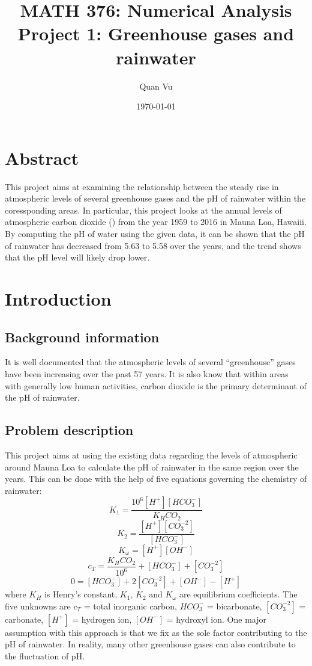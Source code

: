\documentclass{article}
\title{%
	MATH 376: Numerical Analysis \\
	\large  Project 1: Greenhouse gases and rainwater
	}
\author{Quan Vu}
\date{\today}
\begin{document}
	\maketitle
	
	\section{Abstract}
	This project aims at examining the relationship between the steady 	rise in atmospheric levels of several greenhouse gases and the pH of rainwater within the coressponding areas. In particular, this project looks at the annual levels of atmospheric carbon dioxide () from the year 1959 to 2016 in Mauna Loa, Hawaiii. By computing the pH of water using the given data, it can be shown that the pH of rainwater has decreased from 5.63 to 5.58 over the years, and the trend shows that the pH level will likely drop lower.
	
	\section{Introduction}
	
	\subsection{Background information}
	It is well documented that the atmospheric levels of several “greenhouse” gases have been increasing over the past 57 years. It is also know that within areas with generally low human activities, carbon dioxide is the primary determinant of the pH of rainwater.
	
	\subsection{Problem description}
	This project aims at using the existing data regarding the levels of atmospheric  around Mauna Loa to calculate the pH of rainwater in the same region over the years. This can be done with the help of five equations governing the chemistry of rainwater:
	\[ K_1 = \frac{10^6[H^+][HCO_3^-]}{K_HCO_2} \tag{1} \]
	\[ K_2 = \frac{[H^+][CO_3^{-2}]}{[HCO_3^-]} \tag{2} \]
	\[ K_\omega = [H^+][OH^-] \tag{3} \]
	\[ c_T = \frac{K_HCO_2}{10^6} + [HCO_3^-] + [CO_3^{-2}] \tag{4} \]
	\[ 0 = [HCO_3^-] + 2[CO_3^{-2}] + [OH^-] - [H^+] \tag{5} \]
	where ${K_H}$ is Henry's constant, ${K_1}$, ${K_2}$ and ${K_\omega}$ are equilibrium coefficients. The five unknowns are ${c_T}$ = total inorganic carbon, ${HCO_3^-}$ = bicarbonate, ${[CO_3^{-2}]}$ = carbonate, ${[H^+]}$ = hydrogen ion, ${[OH^-]}$ = hydroxyl ion.
	One major assumption with this approach is that we fix  as the sole factor contributing to the pH of rainwater. In reality, many other greenhouse gases can also contribute to the fluctuation of pH.
\end{document}
